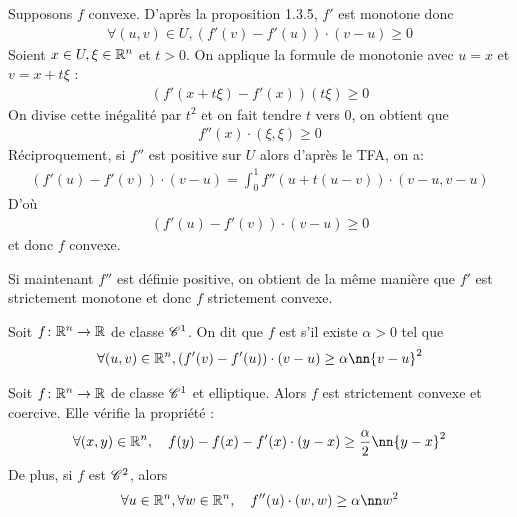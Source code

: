 \documentclass[french,a4paper,10pt]{article}
\begin{document}
	\begin{myproof}
		Supposons $f$ convexe. D'après la proposition 1.3.5, $f'$ est monotone donc
			\[\begin{aligned}
				\forall (u,v)\in U,(f'(v)-f'(u))\cdot(v-u)\ge0
			\end{aligned}\]
		Soient $x\in U,\xi\in\mathbb{R}^n$ et $t>0$. On applique la formule de monotonie avec $u=x$ et $v=x+t\xi$ :
			\[\begin{aligned}
				(f'(x+t\xi)-f'(x))(t\xi)\ge 0
			\end{aligned}\]
		On divise cette inégalité par $t^2$ et on fait tendre $t$ vers 0, on obtient que
			\[\begin{aligned}
				f''(x)\cdot(\xi,\xi)\ge 0
			\end{aligned}\]
		Réciproquement, si $f''$ est positive sur $U$ alors d'après le TFA, on a:
			\[\begin{aligned}
				(f'(u)-f'(v))\cdot(v-u)=\int_0^1 f''(u+t(u-v))\cdot(v-u,v-u)
			\end{aligned}\]
		D'où
			\[\begin{aligned}
				(f'(u)-f'(v))\cdot(v-u)\ge 0
			\end{aligned}\]
		et donc $f$ convexe.
		
		Si maintenant $f''$ est définie positive, on obtient de la même manière que $f'$ est strictement monotone et donc $f$ strictement convexe.
	\end{myproof}
	
	\begin{oc-definition}
		Soit $f\colon\mathbb{R}^n\to\mathbb{R}$ de classe $\mathscr{C}^1$. On dit que $f$ est  s'il existe $\alpha>0$ tel que
			\[\begin{aligned}
				\forall(u,v)\in\bb R^n,(f'(v)-f'(u))\cdot(v-u)\ge\alpha\nn{v-u}^2
			\end{aligned}\]
	\end{oc-definition}
	
	\begin{oc-proposition}
		Soit $f\colon\mathbb{R}^n\to\mathbb{R}$ de classe $\mathscr{C}^1$ et elliptique. Alors $f$ est strictement convexe et coercive. Elle vérifie la propriété :
			\[\begin{aligned}
				\forall (x,y)\in\bb R^n,\quad f(y)-f(x)-f'(x)\cdot(y-x)\ge\frac\alpha2\nn{y-x}^2
			\end{aligned}\]
		De plus, si $f$ est $\mathscr{C}^2$, alors
			\[\begin{aligned}
				\forall u\in \bb R^n,\forall w\in\bb R^n,\quad f''(u)\cdot(w,w)\ge\alpha\nn w^2
			\end{aligned}\]
	\end{oc-proposition}
	
\end{document}
